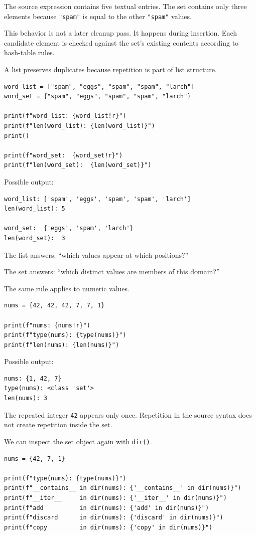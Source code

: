 The source expression contains five textual entries. The set contains only three elements because \texttt{"spam"} is equal to the other \texttt{"spam"} values.

This behavior is not a later cleanup pass. It happens during insertion. Each candidate element is checked against the set's existing contents according to hash-table rules.

A list preserves duplicates because repetition is part of list structure.

\begin{verbatim}
word_list = ["spam", "eggs", "spam", "spam", "larch"]
word_set = {"spam", "eggs", "spam", "spam", "larch"}

print(f"word_list: {word_list!r}")
print(f"len(word_list): {len(word_list)}")
print()

print(f"word_set:  {word_set!r}")
print(f"len(word_set):  {len(word_set)}")
\end{verbatim}

Possible output:

\begin{verbatim}
word_list: ['spam', 'eggs', 'spam', 'spam', 'larch']
len(word_list): 5

word_set:  {'eggs', 'spam', 'larch'}
len(word_set):  3
\end{verbatim}

The list answers: ``which values appear at which positions?''

The set answers: ``which distinct values are members of this domain?''

The same rule applies to numeric values.

\begin{verbatim}
nums = {42, 42, 42, 7, 7, 1}

print(f"nums: {nums!r}")
print(f"type(nums): {type(nums)}")
print(f"len(nums): {len(nums)}")
\end{verbatim}

Possible output:

\begin{verbatim}
nums: {1, 42, 7}
type(nums): <class 'set'>
len(nums): 3
\end{verbatim}

The repeated integer \texttt{42} appears only once. Repetition in the source syntax does not create repetition inside the set.

We can inspect the set object again with \texttt{dir()}.

\begin{verbatim}
nums = {42, 7, 1}

print(f"type(nums): {type(nums)}")
print(f"__contains__ in dir(nums): {'__contains__' in dir(nums)}")
print(f"__iter__     in dir(nums): {'__iter__' in dir(nums)}")
print(f"add          in dir(nums): {'add' in dir(nums)}")
print(f"discard      in dir(nums): {'discard' in dir(nums)}")
print(f"copy         in dir(nums): {'copy' in dir(nums)}")
\end{verbatim}

